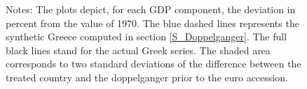 \documentclass[12pt]{article}
\newcommand{\annote}[1]{\parbox{\textwidth}{\renewcommand{\baselinestretch}{1.0}\vspace{12pt} \small Notes: #1}}
\begin{document}
\begin{appendices}
\begin{figure}[h!]
    \annote{The plots depict, for each GDP component, the deviation in percent from the value of 1970. The blue dashed lines represents the synthetic Greece computed in section \ref{S_Doppelganger}. The full black lines stand for the actual Greek series. The shaded area corresponds to two standard deviations of the difference between the treated country and the doppelganger prior to the euro accession. }
\end{figure}


\end{appendices}
\end{document}

